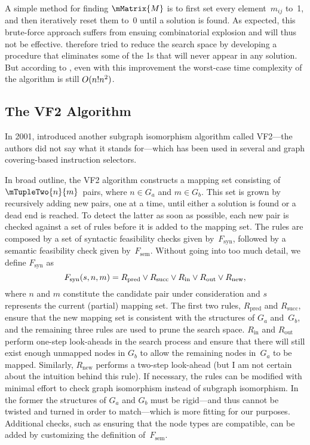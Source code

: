 A simple method for finding $\mMatrix{M}$ is to first set every element~$m_{ij}$
to~1, and then iteratively reset them to~0 until a solution is found.
%
As
expected, this brute-force approach suffers from ensuing combinatorial explosion
and will thus not be effective.
%
\citeauthor{Ullmann1976} therefore tried to
reduce the search space by developing a procedure that eliminates some of the 1s
that will never appear in any solution.
%
But according to
\textcite{Cordella2001}, even with this improvement the worst-case time
complexity of the algorithm is still \mbox{$O(n!n^2)$}.

\subsection{The VF2 Algorithm}

In 2001, \textcite{Cordella2001} introduced another \gls{subgraph isomorphism}
algorithm called \gls{VF2}---the authors did not say what it stands for---which
has been used in several  and \gls{graph covering}-based
instruction selectors.

In broad outline, the \gls{VF2} algorithm constructs a mapping set consisting of
\mbox{$\mTupleTwo{n}{m}$}~pairs, where \mbox{$n \in G_a$} and \mbox{$m \in
  G_b$}.
%
This set is grown by recursively adding new pairs, one at a time, until
either a solution is found or a dead end is reached.
%
To detect the latter as
soon as possible, each new pair is checked against a set of rules before it is
added to the mapping set.
%
The rules are composed by a set of syntactic
feasibility checks given by~$F_{\text{syn}}$, followed by a semantic feasibility
check given by~$F_{\text{sem}}$.
%
Without going into too much detail, we define
$F_{\text{syn}}$ as
\begin{displaymath}
  F_{\text{syn}}(s, n, m) = R_{\text{pred}} \vee R_{\text{succ}} \vee
  R_{\text{in}} \vee R_{\text{out}} \vee R_{\text{new}},
\end{displaymath}
where $n$ and $m$ constitute the candidate pair under consideration and $s$
represents the current (partial) mapping set.
%
The first two rules,
$R_{\text{pred}}$ and $R_{\text{succ}}$, ensure that the new mapping set is
consistent with the structures of $G_a$ and~$G_b$, and the remaining three rules
are used to prune the search space.
%
$R_{\text{in}}$ and $R_{\text{out}}$ perform
one-step look-aheads in the search process and ensure that there will still
exist enough unmapped nodes in $G_b$ to allow the remaining \glspl{node}
in~$G_a$ to be mapped.
%
Similarly, $R_{\text{new}}$ performs a two-step
look-ahead (but I am not certain about the intuition behind this rule).
%
If
necessary, the rules can be modified with minimal effort to check \gls{graph
  isomorphism} instead of \gls{subgraph isomorphism}.
%
In the former the
structures of $G_a$ and $G_b$ must be rigid---and thus cannot be twisted and
turned in order to match---which is more fitting for our purposes.
%
Additional
checks, such as ensuring that the \gls{node} types are compatible, can be added
by customizing the definition of~$F_{\text{sem}}$.

